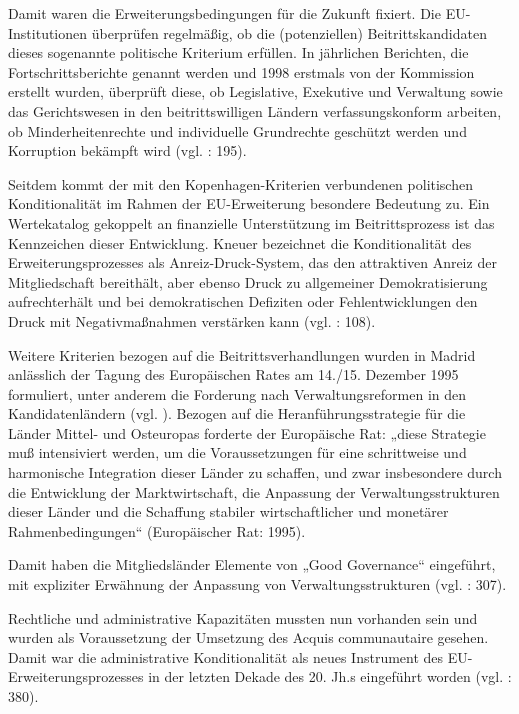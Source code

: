 Damit waren die Erweiterungsbedingungen für die Zukunft fixiert. Die EU-Institutionen überprüfen regelmäßig, ob die (potenziellen) Beitrittskandidaten dieses sogenannte politische Kriterium erfüllen. In jährlichen Berichten, die Fortschrittsberichte genannt werden und 1998 erstmals von der Kommission erstellt wurden, überprüft diese, ob Legislative, Exekutive und Verwaltung sowie das Gerichtswesen in den beitrittswilligen Ländern verfassungskonform arbeiten, ob Minderheitenrechte und individuelle Grundrechte geschützt werden und Korruption bekämpft wird (vgl. \cite{brusis09} : 195).
\par
Seitdem kommt der mit den Kopenhagen-Kriterien verbundenen politischen Konditionalität im Rahmen der EU-Erweiterung besondere Bedeutung zu. Ein Wertekatalog gekoppelt an finanzielle Unterstützung im Beitrittsprozess ist das Kennzeichen dieser Entwicklung. Kneuer bezeichnet die Konditionalität des Erweiterungsprozesses als Anreiz-Druck-System, das den attraktiven Anreiz der Mitgliedschaft bereithält, aber ebenso Druck zu allgemeiner Demokratisierung aufrechterhält und bei demokratischen Defiziten oder Fehlentwicklungen den Druck mit Negativmaßnahmen verstärken kann (vgl. \cite{kneuer07} : 108).\par
Weitere Kriterien bezogen auf die Beitrittsverhandlungen wurden in Madrid anlässlich der Tagung des Europäischen Rates am 14./15. Dezember 1995 formuliert, unter anderem die Forderung nach Verwaltungsreformen in den Kandidatenländern (vgl. \cite{dimit02}). Bezogen auf die Heranführungsstrategie für die Länder Mittel- und Osteuropas forderte der Europäische Rat:
„diese Strategie muß intensiviert werden, um die Voraussetzungen für eine schrittweise und harmonische Integration dieser Länder zu schaffen, und zwar insbesondere durch die Entwicklung der Marktwirtschaft, die Anpassung der Verwaltungsstrukturen dieser Länder und die Schaffung stabiler wirtschaftlicher und monetärer Rahmenbedingungen“ (Europäischer Rat: 1995).\par
Damit haben die Mitgliedsländer Elemente von „Good Governance“ eingeführt, mit expliziter Erwähnung der Anpassung von Verwaltungsstrukturen (vgl. \cite{sabzei} : 307).\par
Rechtliche und administrative Kapazitäten mussten nun vorhanden sein und wurden als Voraussetzung der Umsetzung des Acquis communautaire gesehen. Damit war die administrative Konditionalität als neues Instrument des EU-Erweiterungsprozesses in der letzten Dekade des 20. Jh.s eingeführt worden (vgl. \cite{tomtul} : 380).\par
